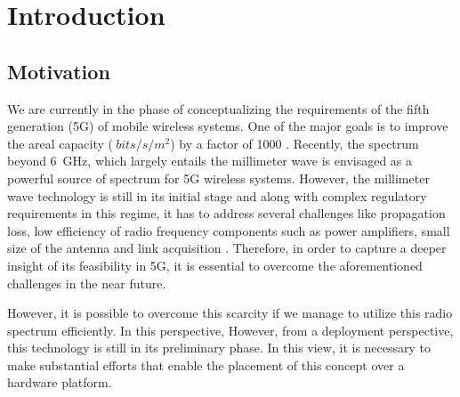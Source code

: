 \chapter{Introduction}

\section{Motivation}
\label{sec:mot}

We are currently in the phase of conceptualizing the requirements of the fifth generation (5G) of mobile wireless systems. One of the major goals is to improve the areal capacity ($\SI{}{bits/s/m^2}$) by a factor of 1000 \cite{Andrews14}.  
Recently, the spectrum beyond \SI{6}{GHz}, which largely entails the millimeter wave is envisaged as a powerful source of spectrum for 5G wireless systems. However, the millimeter wave technology is still in its initial stage and along with complex regulatory requirements in this regime, it has to address several challenges like propagation loss, low efficiency of radio frequency components such as power amplifiers, small size of the antenna and link acquisition \cite{Rapp13}. Therefore, in order to capture a deeper insight of its feasibility in 5G, it is essential to overcome the aforementioned challenges in the near future.

 However, it is possible to overcome this scarcity if we manage to utilize this radio spectrum efficiently. In this perspective,  However, from a deployment perspective, this technology is still in its preliminary phase. In this view, it is necessary to make substantial efforts that enable the placement of this concept over a hardware platform.

